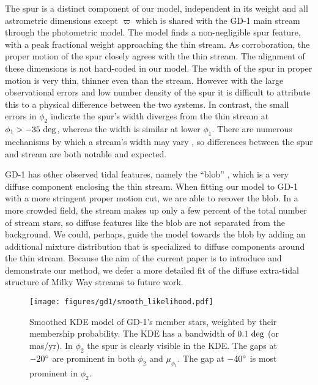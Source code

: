 \documentclass[twocolumn, linenumbers]{aastex631}
\newcommand{\stream}[1]{#1}
\newcommand{\parallax}{\varpi}
\begin{document}
        The spur is a distinct component of our model, independent in its weight
        and all astrometric dimensions except $\parallax$ which is shared with
        the \stream{GD-1} main stream through the photometric model. The model
        finds a non-negligible spur feature, with a peak fractional weight
        approaching the thin stream. As corroboration, the proper motion of the
        spur closely agrees with the thin stream. The alignment of these
        dimensions is not hard-coded in our model. The width of the spur in
        proper motion is very thin, thinner even than the stream.  However with
        the large observational errors and low number density of the spur it is
        difficult to attribute this to a physical difference between the two
        systems. In contrast, the small errors in $\phi_2$ indicate the spur's
        width diverges from the thin stream at $\phi_1 > -35 \ \rm{deg}$,
        whereas the width is similar at lower $\phi_1$. There are numerous
        mechanisms by which a stream's width may vary \citep[e.g.  epicyclic
        effects as in][]{Ibata+2020}, so differences between the spur and stream
        are both notable and expected. 

        \stream{GD-1} has other observed tidal features, namely the ``blob''
        \citep{Price-WhelanBonaca2018}, which is a very diffuse component
        enclosing the thin stream. When fitting our model to \stream{GD-1} with
        a more stringent proper motion cut, we are able to recover the blob. In
        a more crowded field, the stream makes up only a few percent of the
        total number of stream stars, so diffuse features like the blob are not
        separated from the background. We could, perhaps, guide the model
        towards the blob by adding an additional mixture distribution that is
        specialized to diffuse components around the thin stream. Because the
        aim of the current paper is to introduce and demonstrate our method, we
        defer a more detailed fit of the diffuse extra-tidal structure of Milky
        Way streams to future work.

        \begin{figure}[ht]
            \centering
            \hspace{-25 pt}\texttt{[image: figures/gd1/smooth\_likelihood.pdf]}
            \caption{%
                Smoothed KDE model of \stream{GD-1}'s member stars, weighted by
                their membership probability. The KDE has a bandwidth of $0.1 \
                \rm{deg}$ (or mas/yr).  In $\phi_2$ the spur is clearly visible
                in the KDE.  The gaps at $-20\degree$ are prominent in both
                $\phi_2$ and $\mu_{\phi_1}$.  The gap at $-40\degree$ is most
                prominent in $\phi_2$.
            }
            \label{fig:gd1-heatmap}
        \end{figure}
\end{document}
